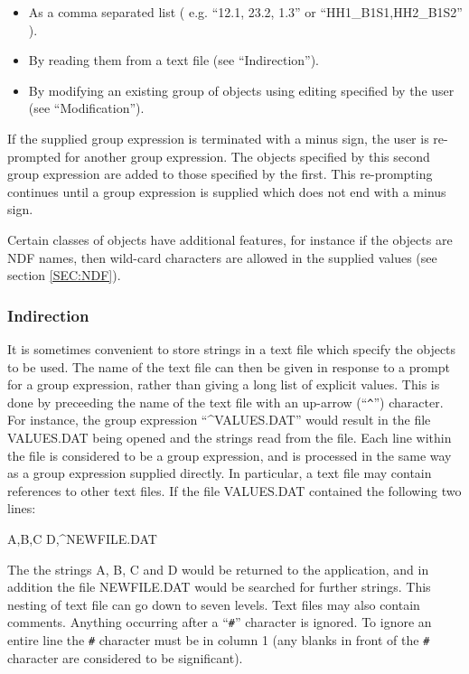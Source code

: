 \documentclass[11pt,nolof,noabs]{starlink}
\begin{document}
\begin{itemize}
\item As a comma separated list ( e.g. ``12.1, 23.2, 1.3''
     or ``HH1\_B1S1,HH2\_B1S2'' ).

\item By reading them from a text file (see ``Indirection'').

\item By modifying an existing group of objects using editing
     specified by the user (see ``Modification'').
\end{itemize}
If the supplied group expression is terminated with a minus
sign, the user is re-prompted for another group expression. The
objects specified by this second group expression are added to
those specified by the first. This re-prompting continues until
a group expression is supplied which does not end with a minus
sign.

Certain classes of objects have additional features, for
instance if the objects are {\small NDF} names, then wild-card characters
are allowed in the supplied values (see section \ref{SEC:NDF}).

\subsubsection{Indirection}
It is sometimes convenient to store strings in a text file which specify the
objects to be used. The name of the text file can
then be given in response to a prompt for a group expression,
rather than giving a long list of explicit values. This is done
by preceeding the name of the text file with an up-arrow (``\verb+^+'')
character. For instance, the group expression ``\^{}{\small VALUES.DAT}''
would result in the file {\small VALUES.DAT} being opened and the strings
read from the file. Each line within the file is considered to
be a group expression, and is processed in the same way as a
group expression supplied directly. In particular, a text file
may contain references to other text files. If the file
{\small VALUES.DAT} contained the following two lines:

\small
\begin{terminalv}
A,B,C
D,^NEWFILE.DAT
\end{terminalv}
\normalsize

The the strings A, B, C and D would be returned to the
application, and in addition the file {\small NEWFILE.DAT} would be
searched for further strings. This nesting of text file can go
down to seven levels. Text files may also contain comments.
Anything occurring after a ``\verb+#+'' character is ignored. To ignore
an entire line the \verb+#+ character must be in column 1 (any blanks in
front of the \verb+#+ character are considered to be significant).
\end{document}
